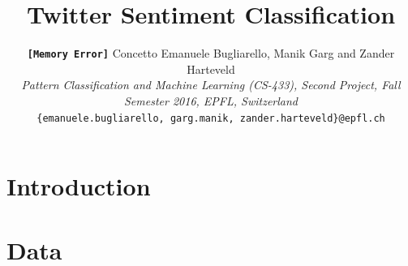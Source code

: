 \documentclass[10pt,conference,compsocconf]{IEEEtran}
\begin{document}
\title{%
Twitter Sentiment Classification}

\author{ \textbf{\texttt{[Memory Error]}}
	Concetto Emanuele Bugliarello, Manik Garg and Zander Harteveld \\
  \textit{Pattern Classification and Machine Learning (CS-433), Second Project, Fall Semester 2016, EPFL, Switzerland}\\
  \texttt{\{emanuele.bugliarello, garg.manik, zander.harteveld\}@epfl.ch}
}

\maketitle

\begin{abstract}

\end{abstract}
\vspace{0cm}
\section{Introduction}


\vspace{0cm}
\section{Data}

%
%
\end{document}
